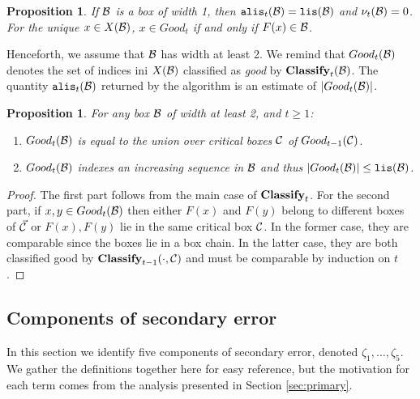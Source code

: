 \documentclass{acmsmall}
\newtheorem{prop}[theorem]{Proposition}
\newcommand{\cB}{{\cal B}}
\newcommand{\cC}{{\cal C}}
\newcommand{\lis}{{\tt lis}}
\newcommand{\alis}{{\tt alis}}
\newcommand{\errorterm}{\zeta}
\newcommand{\classify}{{\rm {\bf Classify}}}
\newcommand{\approxlis}{{\rm {\bf ApproxLIS}}}
\newcommand{\liserror}{\nu}
\begin{document}
%
\begin{prop}
\label{prop:narrow}
If $\cB$ is a box of width 1, then   $\alis_t(\cB)=\lis(\cB)$ and 
$\liserror_t(\cB)=0$. For the unique $x \in X(\cB)$, $x \in Good_t$ if and only if $F(x) \in \cB$.
\end{prop}
%
Henceforth, we assume that $\cB$ has width at least 2. We remind that $Good_t(\cB)$ denotes the set of indices
ini $X(\cB)$ classified as  {\em good} by $\classify_t(\cB)$.
The quantity $\alis_t(\cB)$ returned by the algorithm is an estimate of $|Good_t(\cB)|$. 
%
\begin{prop}
\label{prop:good}
For any box $\cB$ of width at least 2, and $t \geq 1$:
\begin{enumerate}
\item $Good_t(\cB)$ is equal to the union over critical boxes $\cC$ of $Good_{t-1}(\cC)$.
\item $Good_t(\cB)$ indexes an increasing sequence in $\cB$ and thus $|Good_t(\cB)| \leq \lis(\cB)$.
\end{enumerate}
\end{prop}
%
\begin{proof}
The first part follows from the main case of $\classify_t$.
For the second part, if $x,y \in Good_t(\cB)$
then either $F(x)$ and $F(y)$ belong to different boxes of $\vec{\cC}$
or $F(x),F(y)$ lie in the same critical box $\cC$.
In the former case, they are comparable since the boxes lie in a box chain.
In the latter case, they are both classified good by $\classify_{t-1}(\cdot,\cC)$
and must be comparable by induction on $t$.
\end{proof}

\subsection{Components of secondary error } 
\label{subsec:secondary components}

In this section we identify five components of secondary error, denoted $\errorterm_1,\ldots,\errorterm_5$.
We gather the definitions together here for easy reference, but the motivation for each term comes from the analysis
presented in Section \ref{sec:primary}.  

\end{document}
